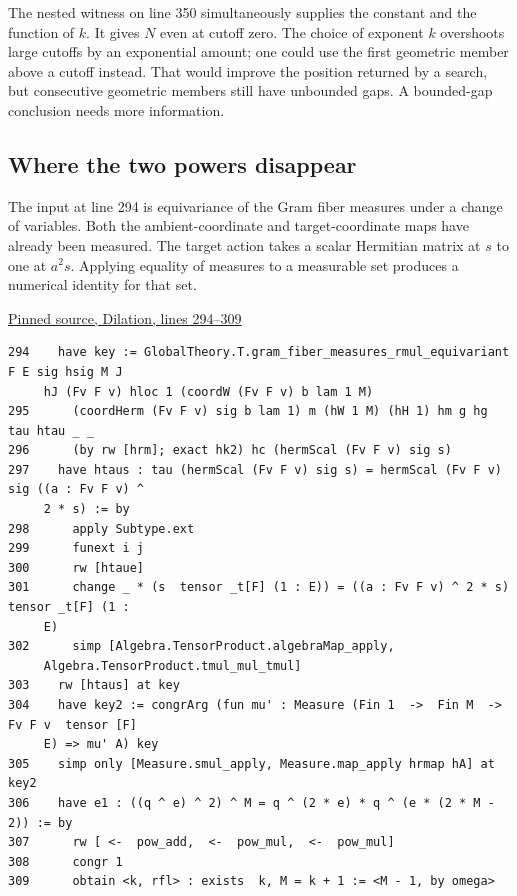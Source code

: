 \documentclass[12pt,letterpaper]{article}
\begin{document}
The nested witness on line 350 simultaneously supplies the constant and the function of \(k\). It gives \(N\) even at cutoff zero. The choice of exponent \(k\) overshoots large cutoffs by an exponential amount; one could use the first geometric member above a cutoff instead. That would improve the position returned by a search, but consecutive geometric members still have unbounded gaps. A bounded-gap conclusion needs more information.

\clearpage\subsection*{Where the two powers disappear}

The input at line 294 is equivariance of the Gram fiber measures under a change of variables. Both the ambient-coordinate and target-coordinate maps have already been measured. The target action takes a scalar Hermitian matrix at \(s\) to one at \(a^2s\). Applying equality of measures to a measurable set produces a numerical identity for that set.

\par\smallskip\href{https://github.com/nousentllc/riemann-hypothesis/blob/40e56bab026552e089d7afcfeff08d2defb9c005/src/CompanionTheory/SpectralGeometry/LocalGlobalProofs/AdelicAnalysis/LocalRankOneDensityUniformizerPower.lean#L294-L309}{\sffamily\small Pinned source, Dilation, lines 294--309}\par

{\footnotesize\begin{verbatim}
294    have key := GlobalTheory.T.gram_fiber_measures_rmul_equivariant F E sig hsig M J
     hJ (Fv F v) hloc 1 (coordW (Fv F v) b lam 1 M)
295      (coordHerm (Fv F v) sig b lam 1) m (hW 1 M) (hH 1) hm g hg tau htau _ _
296      (by rw [hrm]; exact hk2) hc (hermScal (Fv F v) sig s)
297    have htaus : tau (hermScal (Fv F v) sig s) = hermScal (Fv F v) sig ((a : Fv F v) ^
     2 * s) := by
298      apply Subtype.ext
299      funext i j
300      rw [htaue]
301      change _ * (s  tensor _t[F] (1 : E)) = ((a : Fv F v) ^ 2 * s)  tensor _t[F] (1 :
     E)
302      simp [Algebra.TensorProduct.algebraMap_apply,
     Algebra.TensorProduct.tmul_mul_tmul]
303    rw [htaus] at key
304    have key2 := congrArg (fun mu' : Measure (Fin 1  ->  Fin M  ->  Fv F v  tensor [F]
     E) => mu' A) key
305    simp only [Measure.smul_apply, Measure.map_apply hrmap hA] at key2
306    have e1 : ((q ^ e) ^ 2) ^ M = q ^ (2 * e) * q ^ (e * (2 * M - 2)) := by
307      rw [ <-  pow_add,  <-  pow_mul,  <-  pow_mul]
308      congr 1
309      obtain <k, rfl> : exists  k, M = k + 1 := <M - 1, by omega>
\end{verbatim}
}
\end{document}
